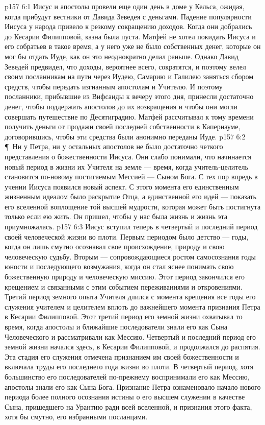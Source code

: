 \vs p157 6:1 Иисус и апостолы провели еще один день в доме у Кельса, ожидая, когда прибудут вестники от Давида Зеведея с деньгами. Падение популярности Иисуса у народа привело к резкому сокращению доходов. Когда они добрались до Кесарии Филипповой, казна была пуста. Матфей не хотел покидать Иисуса и его собратьев в такое время, а у него уже не было собственных денег, которые он мог бы отдать Иуде, как он это неоднократно делал раньше. Однако Давид Зеведей предвидел, что доходы, вероятнее всего, сократятся, и поэтому велел своим посланникам на пути через Иудею, Самарию и Галилею заняться сбором средств, чтобы передать изгнанным апостолам и Учителю. И поэтому посланники, прибывшие из Вифсаиды к вечеру этого дня, принесли достаточно денег, чтобы поддержать апостолов до их возвращения и чтобы они могли совершать путешествие по Десятиградию. Матфей рассчитывал к тому времени получить деньги от продажи своей последней собственности в Капернауме, договорившись, чтобы эти средства были анонимно переданы Иуде.
\vs p157 6:2 \P\ Ни у Петра, ни у остальных апостолов не было достаточно четкого представления о божественности Иисуса. Они слабо понимали, что начинается новый период в жизни их Учителя на земле --- время, когда учитель\hyp{}целитель становится по\hyp{}новому постигаемым Мессией --- Сыном Бога. С тех пор впредь в учении Иисуса появился новый аспект. С этого момента его единственным жизненным идеалом было раскрытие Отца, а единственной его идей --- показать его вселенной воплощение той высшей мудрости, которая может быть постигнута только если ею жить. Он пришел, чтобы у нас была жизнь и жизнь эта приумножалась.
\vs p157 6:3 Иисус вступил теперь в четвертый и последний период своей человеческой жизни во плоти. Первым периодом было детство --- годы, когда он лишь смутно осознавал свое происхождение, природу и свою человеческую судьбу. Вторым --- сопровождающиеся ростом самосознания годы юности и последующего возмужания, когда он стал яснее понимать свою божественную природу и человеческую миссию. Этот период закончился его крещением и связанными с этим событием переживаниями и откровениями. Третий период земного опыта Учителя длился с момента крещения все годы его служения учителем и целителем вплоть до важнейшего момента признания Петра в Кесарии Филипповой. Этот третий период его земной жизни охватывал то время, когда апостолы и ближайшие последователи знали его как Сына Человеческого и рассматривали как Мессию. Четвертый и последний период его земной жизни начался здесь, в Кесарии Филипповой, и продолжался до распятия. Эта стадия его служения отмечена признанием им своей божественности и включала труды его последнего года жизни во плоти. В четвертый период, хотя большинство его последователей по\hyp{}прежнему воспринимали его как Мессию, апостолы знали его как Сына Бога. Признание Петра ознаменовало начало нового периода более полного осознания истины о его высшем служении в качестве Сына, пришедшего на Урантию ради всей вселенной, и признания этого факта, хотя бы смутно, его избранными посланцами.
